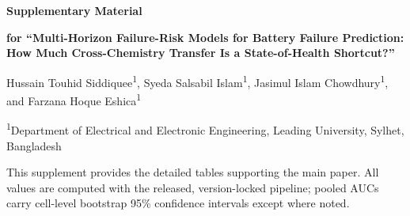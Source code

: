 \documentclass[11pt,a4paper]{article}
\begin{document}
\begin{center}
{\LARGE\bfseries Supplementary Material\par}
\vspace{10pt}
{\large\bfseries for ``Multi-Horizon Failure-Risk Models for Battery Failure Prediction: How Much Cross-Chemistry Transfer Is a State-of-Health Shortcut?''\par}
\vspace{12pt}
{\normalsize Hussain Touhid Siddiquee\textsuperscript{1}, Syeda Salsabil Islam\textsuperscript{1}, Jasimul Islam Chowdhury\textsuperscript{1}, and Farzana Hoque Eshica\textsuperscript{1}\par}
\vspace{7pt}
\textsuperscript{1}Department of Electrical and Electronic Engineering, Leading University, Sylhet, Bangladesh\par
\end{center}
\vspace{12pt}
This supplement provides the detailed tables supporting the main paper. All values are computed with the released, version-locked pipeline; pooled AUCs carry cell-level bootstrap 95\% confidence intervals except where noted.
\end{document}
